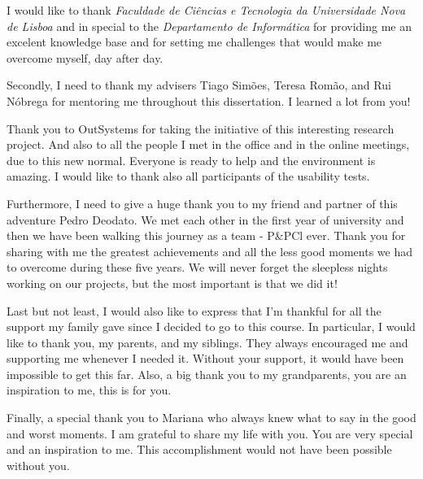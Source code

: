 \acknowledgements

I would like to thank \textit{Faculdade de Ciências e Tecnologia da Universidade Nova de Lisboa} and in special to the \textit{Departamento de Informática} for providing me an excelent knowledge base and for setting me challenges that would make me overcome myself, day after day.

Secondly, I need to thank my advisers Tiago Simões, Teresa Romão, and Rui Nóbrega for mentoring me throughout this dissertation. I learned a lot from you!  

Thank you to OutSystems for taking the initiative of this interesting research project. And also to all the people I met in the office and in the online meetings, due to this new normal. Everyone is ready to help and the environment is amazing. I would like to thank also all participants of the usability tests.

Furthermore, I need to give a huge thank you to my friend and partner of this adventure Pedro Deodato. We met each other in the first year of university and then we have been walking this journey as a team - P\&PCl ever. Thank you for sharing with me the greatest achievements and all the less good moments we had to overcome during these five years. We will never forget the sleepless nights working on our projects, but the most important is that we did it!

Last but not least, I would also like to express that I'm thankful for all the support my family gave since I decided to go to this course. In particular, I would like to thank you, my parents, and my siblings. They always encouraged me and supporting me whenever I needed it. Without your support, it would have been impossible to get this far. Also, a big thank you to my grandparents, you are an inspiration to me, this is for you. 

Finally, a special thank you to Mariana who always knew what to say in the good and worst moments. I am grateful to share my life with you. You are very special and an inspiration to me. This accomplishment would not have been possible without you.

